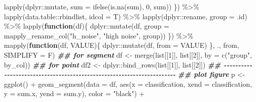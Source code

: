 \documentclass[
]{article}
\newenvironment{Shaded}{\begin{snugshade}}{\end{snugshade}}
\newcommand{\AttributeTok}[1]{\textcolor[rgb]{0.77,0.63,0.00}{#1}}
\newcommand{\ControlFlowTok}[1]{\textcolor[rgb]{0.13,0.29,0.53}{\textbf{#1}}}
\newcommand{\DecValTok}[1]{\textcolor[rgb]{0.00,0.00,0.81}{#1}}
\newcommand{\DocumentationTok}[1]{\textcolor[rgb]{0.56,0.35,0.01}{\textbf{\textit{#1}}}}
\newcommand{\FunctionTok}[1]{\textcolor[rgb]{0.00,0.00,0.00}{#1}}
\newcommand{\NormalTok}[1]{#1}
\newcommand{\OtherTok}[1]{\textcolor[rgb]{0.56,0.35,0.01}{#1}}
\newcommand{\SpecialCharTok}[1]{\textcolor[rgb]{0.00,0.00,0.00}{#1}}
\newcommand{\StringTok}[1]{\textcolor[rgb]{0.31,0.60,0.02}{#1}}
\begin{document}
\begin{Shaded}
\begin{Highlighting}[]
                 \FunctionTok{lapply}\NormalTok{(dplyr}\SpecialCharTok{::}\NormalTok{mutate, }\AttributeTok{sum =} \FunctionTok{ifelse}\NormalTok{(}\FunctionTok{is.na}\NormalTok{(sum), }\DecValTok{0}\NormalTok{, sum))}
\NormalTok{           \}) }\SpecialCharTok{\%\textgreater{}\%} 
      \FunctionTok{lapply}\NormalTok{(data.table}\SpecialCharTok{::}\NormalTok{rbindlist, }\AttributeTok{idcol =}\NormalTok{ T) }\SpecialCharTok{\%\textgreater{}\%} 
      \FunctionTok{lapply}\NormalTok{(dplyr}\SpecialCharTok{::}\NormalTok{rename, }\AttributeTok{group =}\NormalTok{ .id) }\SpecialCharTok{\%\textgreater{}\%} 
      \FunctionTok{lapply}\NormalTok{(}\ControlFlowTok{function}\NormalTok{(df)\{}
\NormalTok{               dplyr}\SpecialCharTok{::}\FunctionTok{mutate}\NormalTok{(df, }\AttributeTok{group =} \FunctionTok{mapply\_rename\_col}\NormalTok{(}\StringTok{"h\_noise"}\NormalTok{, }\StringTok{"high noise"}\NormalTok{, group))}
\NormalTok{           \}) }\SpecialCharTok{\%\textgreater{}\%} 
      \FunctionTok{mapply}\NormalTok{(}\ControlFlowTok{function}\NormalTok{(df, VALUE)\{}
\NormalTok{               dplyr}\SpecialCharTok{::}\FunctionTok{mutate}\NormalTok{(df, }\AttributeTok{from =}\NormalTok{ VALUE)}
\NormalTok{           \}, ., from, }\AttributeTok{SIMPLIFY =}\NormalTok{ F)}
    \DocumentationTok{\#\# for segment}
\NormalTok{    df }\OtherTok{\textless{}{-}} \FunctionTok{merge}\NormalTok{(list[[}\DecValTok{1}\NormalTok{]], list[[}\DecValTok{2}\NormalTok{]], }\AttributeTok{by =} \FunctionTok{c}\NormalTok{(}\StringTok{"group"}\NormalTok{, by\_col))}
    \DocumentationTok{\#\# for point}
\NormalTok{    df2 }\OtherTok{\textless{}{-}}\NormalTok{ dplyr}\SpecialCharTok{::}\FunctionTok{bind\_rows}\NormalTok{(list[[}\DecValTok{1}\NormalTok{]], list[[}\DecValTok{2}\NormalTok{]])}
    \DocumentationTok{\#\# {-}{-}{-}{-}{-}{-}{-}{-}{-}{-}{-}{-}{-}{-}{-}{-}{-}{-}{-}{-}{-}{-}{-}{-}{-}{-}{-}{-}{-}{-}{-}{-}{-}{-}{-}{-}{-}{-}{-}{-}{-}{-}{-}{-}{-}{-}{-}{-}{-}{-}{-}{-}{-}{-}{-}{-}{-}{-}{-}{-}{-}{-}{-}{-}{-}{-}{-}{-}{-}{-} }
    \DocumentationTok{\#\# plot figure}
\NormalTok{    p }\OtherTok{\textless{}{-}} \FunctionTok{ggplot}\NormalTok{() }\SpecialCharTok{+}
      \FunctionTok{geom\_segment}\NormalTok{(}\AttributeTok{data =}\NormalTok{ df,}
                   \FunctionTok{aes}\NormalTok{(}\AttributeTok{x =}\NormalTok{ classification,}
                       \AttributeTok{xend =}\NormalTok{ classification,}
                       \AttributeTok{y =}\NormalTok{ sum.x,}
                       \AttributeTok{yend =}\NormalTok{ sum.y),}
                   \AttributeTok{color =} \StringTok{"black"}\NormalTok{) }\SpecialCharTok{+}

\end{Highlighting}
\end{Shaded}
\end{document}
